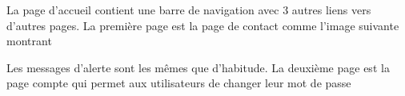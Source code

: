 \documentclass{article}
\begin{document}
\begin{enumerate}
   La page d'accueil contient une barre de navigation avec 3 autres liens vers d'autres pages.
La première page est la page de contact comme l'image suivante montrant
  
\vspace{0.7cm}
   

   \hspace*{-0.7in}
               \noindent{} 
               
               Les messages d'alerte sont les mêmes que d'habitude. La deuxième page est la page compte qui permet aux utilisateurs de changer leur mot de passe
  
  \vspace{0.7cm}
   
\hspace*{-0.7in}
               \noindent{}  
               

\end{enumerate}
\end{document}
